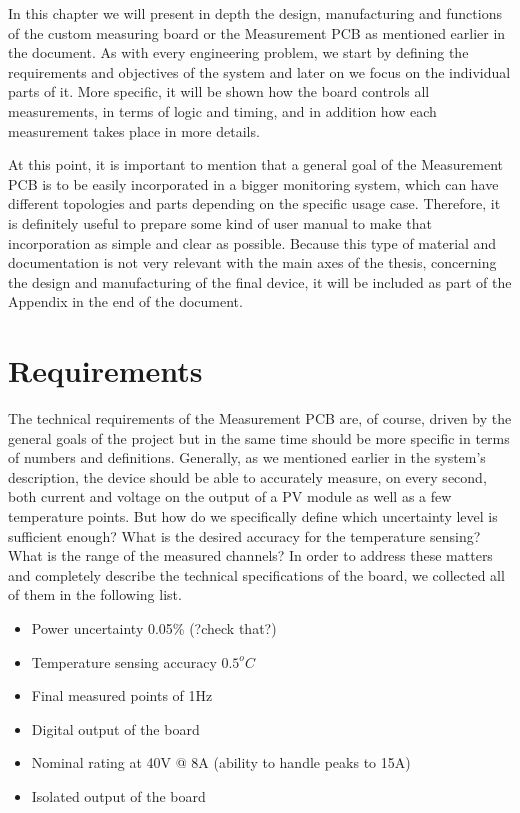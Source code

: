 In this chapter we will present in depth the design, manufacturing and functions of the custom measuring board or the Measurement PCB as mentioned earlier in the document. As with every engineering problem, we start by defining the requirements and objectives of the system and later on we focus on the individual parts of it. More specific, it will be shown how the board controls all measurements, in terms of logic and timing, and in addition how each measurement takes place in more details. \par
At this point, it is important to mention that a general goal of the Measurement PCB is to be easily incorporated in a bigger monitoring system, which can have different topologies and parts depending on the specific usage case. Therefore, it is definitely useful to prepare some kind of user manual to make that incorporation as simple and clear as possible. Because this type of material and documentation is not very relevant with the main axes of the thesis, concerning the design and manufacturing of the final device, it will be included as part of the Appendix in the end of the document.

\section{Requirements}
The technical requirements of the Measurement PCB are, of course, driven by the general goals of the project but in the same time should be more specific in terms of numbers and definitions. Generally, as we mentioned earlier in the system's description, the device should be able to accurately measure, on every second, both current and voltage on the output of a PV module as well as a few temperature points. But how do we specifically define which uncertainty level is sufficient enough? What is the desired accuracy for the temperature sensing? What is the range of the measured channels? In order to address these matters and completely describe the technical specifications of the board, we collected all of them in the following list.

\begin{itemize}
  \item Power uncertainty 0.05\% (?check that?)
  \item Temperature sensing accuracy $0.5^oC$
  \item Final measured points of 1Hz
  \item Digital output of the board
  \item Nominal rating at 40V @ 8A (ability to handle peaks to 15A)
  \item Isolated output of the board
\end{itemize}

